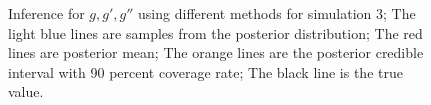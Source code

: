 \documentclass{article}
\begin{document}
\begin{figure}[p]
{    }
    \caption{Inference for $g,g',g''$ using different methods for simulation 3; The light blue lines are samples from the posterior distribution; The red lines are posterior mean; The orange lines are the posterior credible interval with 90 percent coverage rate; The black line is the true value.}
    \label{fig:sim3-1replic}
\end{figure}
\end{document}
